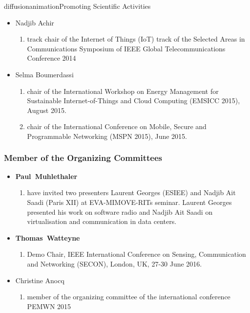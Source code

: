 \documentclass{ra2016}
\newcommand{\paul}  {\textbf{Paul~Muhlethaler}}
\newcommand{\thomas}  {\textbf{Thomas~Watteyne}}
\begin{document}
\begin{module}{diffusion}{animation}{Promoting Scientific Activities}
\begin{itemize}
\begin{enumerate}
        \end{enumerate}
    \item Nadjib Achir
        \begin{enumerate}
            \item track chair of the Internet of Things (IoT) track of the Selected Areas in Communications Symposium of IEEE Global Telecommunications Conference 2014
        \end{enumerate}
    \item Selma Boumerdassi
        \begin{enumerate}
            \item chair of the International Workshop on Energy Management for Sustainable Internet-of-Things and Cloud Computing (EMSICC 2015), August 2015.
						\item chair of the International Conference on Mobile, Secure and Programmable Networking (MSPN 2015), June 2015.
        \end{enumerate}
\end{itemize}

    
    \subsubsection{Member of the Organizing Committees}
    \begin{itemize}
    \item \paul
        \begin{enumerate}
            \item have invited two presenters Laurent Georges (ESIEE)  and Nadjib Ait Saadi (Paris XII) at EVA-MIMOVE-RITs seminar. Laurent Georges presented his work on software radio and  Nadjib Ait Saadi on virtualisation and communication in data centers. 
        \end{enumerate}
    \item \thomas
        \begin{enumerate}
            \item Demo Chair, IEEE International Conference on Sensing, Communication and Networking (SECON), London, UK, 27-30 June 2016.
        \end{enumerate}
    \item Christine Anocq
        \begin{enumerate}
            \item member of the organizing committee of the international conference PEMWN 2015
        \end{enumerate}
\end{itemize}


\end{module}
\end{document}
